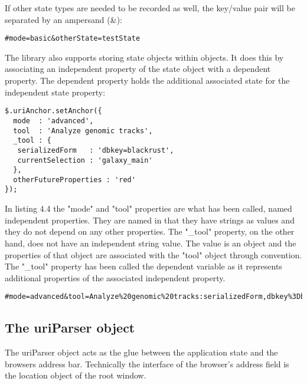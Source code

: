 \documentclass[english]{ifimaster}
\begin{document}
If other state types are needed to be recorded as well, the key/value pair will be separated by an ampersand (\&):

\begin{lstlisting}[caption=Standard key/value separation of the URI parameters.]
  #mode=basic&otherState=testState
\end{lstlisting}

The library also supports storing state objects within objects. It does this by associating an independent property of the state object with a dependent property. The dependent property holds the additional associated state for the independent state property:

\begin{lstlisting}[caption={The uriAnchor library. Parsed complex object.},label={lst:setAnchorImp}]
  $.uriAnchor.setAnchor({
  mode  : 'advanced',
  tool  : 'Analyze genomic tracks',
  _tool : {
   serializedForm   : 'dbkey=blackrust',
   currentSelection : 'galaxy_main'
  },
  otherFutureProperties : 'red'
});
\end{lstlisting}

In listing 4.4 the "mode" and "tool" properties are what has been called, named independent properties. They are named in that they have strings as values and they do not depend on any other properties. The "\_tool" property, on the other hand, does not have an independent string value. The value is an object and the properties of that object are associated with the "tool" object through convention. The "\_tool" property has been called the dependent variable as it represents additional properties of the associated independent property. 

\begin{lstlisting}[caption={Example of a stringified complex object.}, label={lst:uriAnchorURIImpl}]
#mode=advanced&tool=Analyze%20genomic%20tracks:serializedForm,dbkey%3Dblackrust|currentSelection,galaxy_main&otherFutureProperties=red
\end{lstlisting}

\subsection{The uriParser object}
The uriParser object acts as the glue between the application state and the browsers address bar. Technically the interface of the browser's address field is the location object of the root window. %
\end{document}

